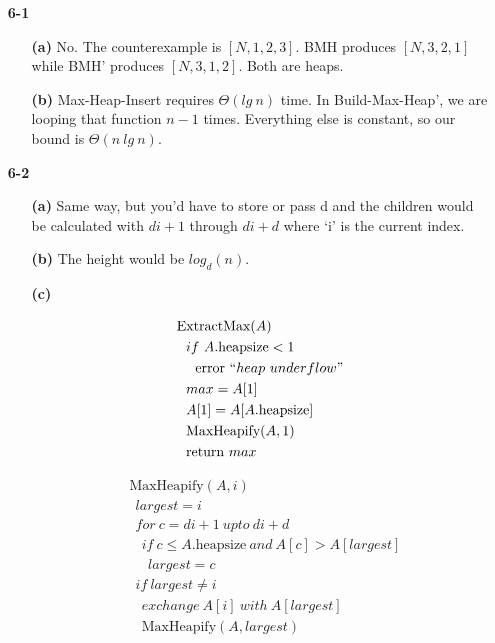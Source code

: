 \documentclass{article}
\begin{document}
\begin{enumerate}
\item[\textbf{6-1}]

	\begin{enumerate}

	\item[\textbf{(a)}]
	No. The counterexample is $[N,1,2,3]$. BMH produces $[N,3,2,1]$ while BMH' produces $[N,3,1,2]$. Both are heaps.

	\item[\textbf{(b)}]
	Max-Heap-Insert requires $\Theta(lg\ n)$ time. In Build-Max-Heap', we are
	looping that function $n-1$ times. Everything else is constant, so our bound is
	$\Theta(n\ lg\ n)$.

	\end{enumerate}

\item[\textbf{6-2}]

	\begin{enumerate}

	\item[\textbf{(a)}]
	Same way, but you'd have to store or pass d and the children would be
	calculated with $di + 1$ through $di+d$ where `i' is the current index.

	\item[\textbf{(b)}]
	The height would be $log_d(n)$.

	\item[\textbf{(c)}]
	
	\begin{align*}
	& \text{ExtractMax}(A) \\
	& \ \ if\ A.\text{heapsize} < 1 \\
	& \ \ \ \ \text{error}\ ``heap\ underflow" \\
	& \ \ max = A[1] \\
	& \ \ A[1] = A[A.\text{heapsize}] \\
	& \ \ \text{MaxHeapify}(A,1) \\
	& \ \ \text{return}\ max
	\end{align*}
	
	\begin{align*}
	& \text{MaxHeapify}(A,i) \\
	& \ \ largest = i \\
	& \ \ for\ c = di + 1\ upto\ di + d \\
	& \ \ \ \ if\ c \leq A.\text{heapsize}\ and\ A[c] > A[largest] \\
	& \ \ \ \ \ \ largest = c \\
	& \ \ if\ largest \neq i \\
	& \ \ \ \ exchange\ A[i]\ with\ A[largest] \\
	& \ \ \ \ \text{MaxHeapify}(A,largest) 
	\end{align*}


\end{enumerate}
\end{enumerate}
\end{document}
